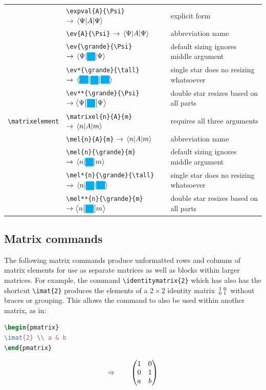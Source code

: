\documentclass[a4paper,12pt]{article}
\begin{document}
\begin{longtable}[c]{|L{0.25\textwidth}|L{0.35\textwidth}|L{0.3\textwidth}|}
& \verb|\expval{A}{\Psi}| $\rightarrow \expval{A}{\Psi}$ & explicit form \\
& \verb|\ev{A}{\Psi}| $\rightarrow \ev{A}{\Psi}$ & abbreviation name \\
& \verb|\ev{\grande}{\Psi}| $\rightarrow \ev{\grande}{\Psi}$ & default sizing ignores middle argument \\
& \verb|\ev*{\grande}{\tall}| $\rightarrow \ev*{\grande}{\tall}$ & single star does no resizing whatsoever \\
& \verb|\ev**{\grande}{\Psi}| $\rightarrow \ev**{\grande}{\Psi}$ & double star resizes based on all parts \\\hline
\verb|\matrixelement| & \verb|\matrixel{n}{A}{m}| $\rightarrow \matrixel{n}{A}{m}$ & requires all three arguments \\
& \verb|\mel{n}{A}{m}| $\rightarrow \mel{n}{A}{m}$ & abbreviation name \\
& \verb|\mel{n}{\grande}{m}| $\rightarrow \mel{n}{\grande}{m}$ & default sizing ignores middle argument \\
& \verb|\mel*{n}{\grande}{\tall}| $\rightarrow \mel*{n}{\grande}{\tall}$ & single star does no resizing whatsoever \\
& \verb|\mel**{n}{\grande}{m}| $\rightarrow \mel**{n}{\grande}{m}$ & double star resizes based on all parts \\\hline
\end{longtable}
\subsection{Matrix commands}
The following matrix commands produce unformatted rows and columns of matrix elements for use as separate matrices as well as blocks within larger matrices. For example, the command \verb|\identitymatrix{2}| which has also has the shortcut \verb|\imat{2}| produces the elements of a $2 \times 2$ identity matrix $\smqty{\imat{2}}$ without braces or grouping. This allows the command to also be used within another matrix, as in:

\begin{minipage}{3cm}
\begin{lstlisting}[language=TeX,basicstyle=\ttfamily\normalsize]
\begin{pmatrix}
\imat{2} \\ a & b
\end{pmatrix}
\end{lstlisting}
\end{minipage}
\begin{minipage}{6cm}
\begin{displaymath}
\Rightarrow\qquad
\begin{pmatrix}
\imat{2} \\ a & b
\end{pmatrix}
\end{displaymath}
\end{minipage}
\end{document}
